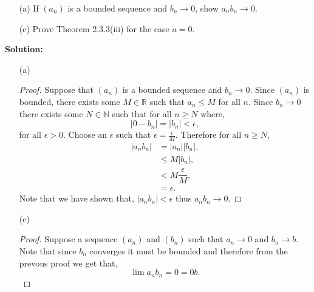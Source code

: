 \documentclass[12pt]{article}
\makeatletter
\theoremstyle{homework}
\newenvironment{exercise}[1]
{\def\@currentlabel{#1}\exercisecore}
{\endexercisecore}
\newcommand{\localhead}[1]{\par\smallskip\noindent\textbf{#1}\nobreak\\}%
\newcommand\solution{\localhead{Solution:}}
\newcommand{\Reals}{\ensuremath{\mathbb R}}
\newcommand{\Nats}{\ensuremath{\mathbb N}}
\makeatother
\begin{document}
\begin{exercise}{2.3.9(a)(c)}
\strut
\begin{enumerate}
	\item[(a)] If $(a_n)$ is a bounded sequence and $b_n\to 0$,
	show $a_nb_n\to 0$.
	\item[(c)] Prove Theorem 2.3.3(iii) for the case $a=0$.
\end{enumerate}
\end{exercise}
\solution
\begin{enumerate}
	\item[(a)] 
	\begin{proof} Suppose that $(a_n)$ is a bounded sequence and $b_n\to 0$. Since $(a_n)$ is bounded, there exists some $M \in \Reals$
		such that $a_n \le M$ for all $n$. Since $b_n \to 0$ there exists some $N \in \Nats$ such that for all $n \geq N$ where, 
		\begin{equation*}
			|0 - b_n| = |b_n| < \epsilon, 
		\end{equation*} 
		for all $\epsilon > 0$. Choose an $\epsilon$ such that $\epsilon = \frac{\epsilon}{M}$. Therefore for all $n \geq N$,
		\begin{align*}
			|a_nb_n| &= |a_n||b_n|,\\
			&\le M|b_n|,\\
			&< M\dfrac{\epsilon}{M},\\ 
			&= \epsilon.  
		\end{align*}
		Note that we have shown that, $|a_nb_n| < \epsilon$ thus $a_nb_n\to 0$.


	\end{proof}
	\item[(c)]
	\begin{proof} Suppose a sequence $(a_n)$ and $(b_n)$ such that $a_n\to 0$ and $b_n\to b$. Note that since $b_n$ converges it must be bounded and therefore from the prevous proof we get
		that,
		\begin{equation*}
	\lim a_nb_n = 0 = 0b.
		\end{equation*}
		
	\end{proof}
\end{enumerate}
\end{document}
